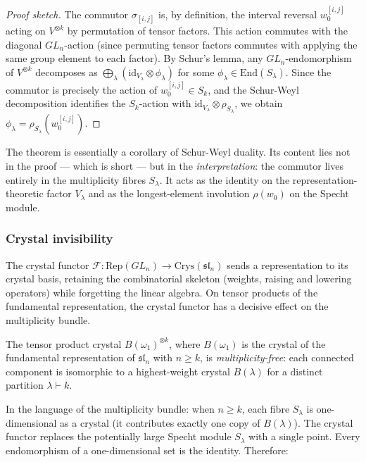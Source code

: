 \begin{proof}[Proof sketch]
The commutor $\sigma_{[i,j]}$ is, by definition, the interval reversal
$w_0^{[i,j]}$ acting on $V^{\otimes k}$ by permutation of tensor
factors.  This action commutes with the diagonal $GL_n$-action (since
permuting tensor factors commutes with applying the same group element
to each factor).  By Schur's lemma, any $GL_n$-endomorphism of
$V^{\otimes k}$ decomposes as $\bigoplus_\lambda (\mathrm{id}_{V_\lambda}
\otimes \phi_\lambda)$ for some $\phi_\lambda \in \mathrm{End}(S_\lambda)$.
Since the commutor is precisely the action of $w_0^{[i,j]} \in S_k$,
and the Schur-Weyl decomposition identifies the $S_k$-action with
$\mathrm{id}_{V_\lambda} \otimes \rho_{S_\lambda}$, we obtain
$\phi_\lambda = \rho_{S_\lambda}(w_0^{[i,j]})$.
\end{proof}

\noindent
The theorem is essentially a corollary of Schur-Weyl duality.  Its
content lies not in the proof --- which is short --- but in the
\emph{interpretation}: the commutor lives entirely in the multiplicity
fibres $S_\lambda$.  It acts as the identity on the representation-theoretic
factor $V_\lambda$ and as the longest-element involution $\rho(w_0)$ on
the Specht module.

\subsubsection*{Crystal invisibility}

The crystal functor $\mathcal{F} \colon \mathrm{Rep}(GL_n) \to
\mathrm{Crys}(\mathfrak{sl}_n)$ sends a representation to its crystal
basis, retaining the combinatorial skeleton (weights, raising and
lowering operators) while forgetting the linear algebra.  On tensor
products of the fundamental representation, the crystal functor has a
decisive effect on the multiplicity bundle.

\begin{proposition}
\label{prop:crystal-mf}
The tensor product crystal $B(\omega_1)^{\otimes k}$, where
$B(\omega_1)$ is the crystal of the fundamental representation of
$\mathfrak{sl}_n$ with $n \geq k$, is \emph{multiplicity-free}: each
connected component is isomorphic to a highest-weight crystal
$B(\lambda)$ for a distinct partition $\lambda \vdash k$.
\end{proposition}

\noindent
In the language of the multiplicity bundle: when $n \geq k$, each
fibre $S_\lambda$ is one-dimensional as a crystal (it contributes
exactly one copy of $B(\lambda)$).  The crystal functor replaces the
potentially large Specht module $S_\lambda$ with a single point.
Every endomorphism of a one-dimensional set is the identity.
Therefore:

